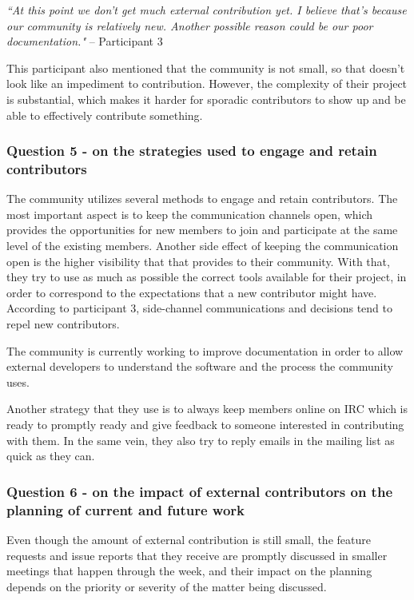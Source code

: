\documentclass{sigchi}
\begin{document}
\begin{displayquote}
\textit{``At this point we don't get much external contribution yet. I believe that's because our community is relatively new. Another possible reason could be our poor documentation."} – Participant 3
\end{displayquote}

This participant also mentioned that the community is not small, so that doesn't look like an impediment to contribution. However, the complexity of their project is substantial, which makes it harder for sporadic contributors to show up and be able to effectively contribute something.

\subsubsection{Question 5 - on the strategies used to engage and retain contributors}

The community utilizes several methods to engage and retain contributors. The most important aspect is to keep the communication channels open, which provides the opportunities for new members to join and participate at the same level of the existing members. Another side effect of keeping the communication open is the higher visibility that that provides to their community. With that, they try to use as much as possible the correct tools available for their project, in order to correspond to the expectations that a new contributor might have. According to participant 3, side-channel communications and decisions tend to repel new contributors.

The community is currently working to improve documentation in order to allow external developers to understand the software and the process the community uses.

Another strategy that they use is to always keep members online on IRC which is ready to promptly ready and give feedback to someone interested in contributing with them. In the same vein, they also try to reply emails in the mailing list as quick as they can.

\subsubsection{Question 6 - on the impact of external contributors on the planning of current and future work}

Even though the amount of external contribution is still small, the feature requests and issue reports that they receive are promptly discussed in smaller meetings that happen through the week, and their impact on the planning depends on the priority or severity of the matter being discussed.
\end{document}
